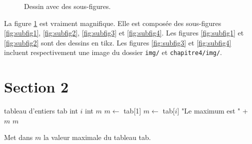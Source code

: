 \begin{figure}
{    }
  \caption[Dessins]{Dessin avec des sous-figures.}
  \label{fig:figure1}
\end{figure}

La figure \ref{fig:figure1} est vraiment magnifique. Elle est composée des sous-figures \ref{fig:subfig1}, \ref{fig:subfig2}, \ref{fig:subfig3} et \ref{fig:subfig4}. Les figures \ref{fig:subfig1} et \ref{fig:subfig2} sont des dessins en tikz. Les figures \ref{fig:subfig3} et \ref{fig:subfig4} incluent respectivement une image du dossier \texttt{img/} et \texttt{chapitre4/img/}.

\section{Section 2}

\begin{algorithm}
  \begin{algorithmic}
    \STATE tableau d'entiers tab 
    \STATE int $i$ 
    \STATE int $m$ 
    \STATE
    \STATE $m \leftarrow$ tab[1]
        \STATE $m \leftarrow$ tab[$i$]
      \ENDIF
      \STATE
      \STATE \PRINT "Le maximum est " + $m$
      \RETURN $m$
    \ENDFOR
  \end{algorithmic}
  \caption[Algorithme 1 (nom dans la liste des algorithmes)]{Met dans $m$ la valeur maximale du tableau tab.\label{ag:algo1}}
\end{algorithm}

